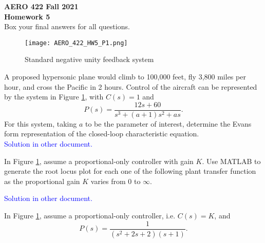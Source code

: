 \documentclass[10.5pt,letter]{exam}
\newcommand{\ans}[1]{\textcolor{blue}{#1}}
\begin{document}
\begin{center}
    {\bf AERO 422 Fall 2021\\
    Homework 5} \\
    Box your final answers for all questions.
\end{center}

\begin{questions}
    \begin{figure}[hbt!]
        \centering
        \texttt{[image: AERO\_422\_HW5\_P1.png]}
        \caption{Standard negative unity feedback system}
        \label{fig:CLsys}
    \end{figure}
\question[3] A proposed hypersonic plane would climb to 100,000 feet, fly 3,800 miles per hour, and cross
the Pacific in 2 hours. Control of the aircraft can be represented by the system in Figure \ref{fig:CLsys}, with $C(s)=1$ and $$P(s) = \frac{12s+60}{s^3+(a+1)s^2+as}.$$
For this system, taking $a$ to be the parameter of interest, determine the Evans form representation
of the closed-loop characteristic equation.\\
\ans{Solution in other document.}

\question[3] In Figure \ref{fig:CLsys}, assume a proportional-only controller with gain $K$.
Use MATLAB to generate the root locus plot for each one of the following plant transfer function as the proportional gain $K$ varies from 0 to $\infty$. 
\ans{Solution in other document.}

\question In Figure \ref{fig:CLsys}, assume a proportional-only controller, i.e. $C(s)=K$, and $$ P(s) = \frac{1}{(s^2+2s+2)(s+1)} .$$
\end{questions}
\end{document}
